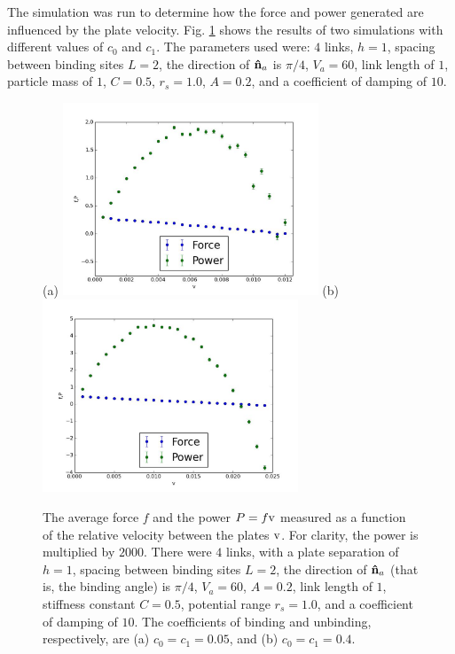 \documentclass[journal = mamobx, manuscript = article]{achemso}
\def\nhat{{\bf\hat n}}
\begin{document}
The simulation was run to determine how the force and power 
generated are influenced by the plate velocity. Fig. \ref{fig:expVper} shows the
results of two simulations with different values of $c_0$ and $c_1$.
The parameters used were: $4$ links, $h=1$, spacing between binding sites $L = 2$, the direction of $\nhat_a$ 
is $\pi/4$, $V_a=60$, link length of $1$, particle mass of $1$, $C=0.5$,
$r_s = 1.0$, $A = 0.2$, and a coefficient of damping of $10$.

\begin{figure}[htp]
\begin{center}
(a)
\includegraphics[width=3in]{0505per}
(b)
\includegraphics[width=3in]{4040per}
\caption{
The average force $f$ and the power $P=f {\rm v}$ measured as a function of the
relative velocity between the plates $\rm v$.  For clarity, the power is multiplied by $2000$. 
There were $4$ links, with a plate
separation of $h=1$, spacing between binding sites $L = 2$, the direction of $\nhat_a$ (that is, the binding angle) is
$\pi/4$, $V_a=60$, $A=0.2$, link length of $1$, stiffness constant $C=0.5$,
potential range $r_s = 1.0$, and a coefficient of damping of $10$. The coefficients of binding and unbinding, respectively, are (a) $c_0 = c_1 = 0.05$, and (b) $c_0 = c_1 = 0.4$.
}
\label{fig:expVper}
\end{center}
\end{figure}
\end{document}
